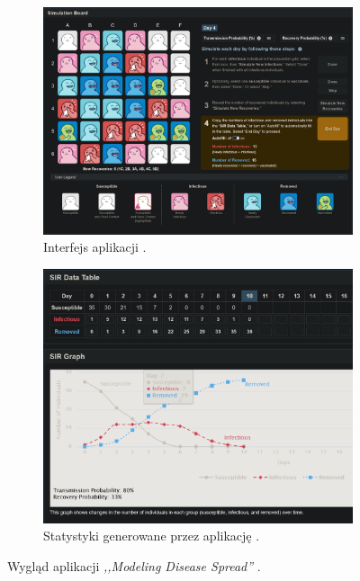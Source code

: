 \begin{figure}
	\centering
	\begin{subfigure}{0.8\textwidth}
		\includegraphics[width=\textwidth]{biointeractiveSIR.png}
		\caption{Interfejs aplikacji \cite{bib:BioInteractiveApp}.}
		\label{fig:lewy-gorny}
	\end{subfigure}
	
	\vspace{1cm} %
	
	\begin{subfigure}{0.8\textwidth}
		\includegraphics[width=\textwidth]{biointeractiveSIR1.png}
		\caption{Statystyki generowane przez aplikację \cite{bib:BioInteractiveApp}.}
		\label{fig:prawy-gorny}
	\end{subfigure}
	
	\caption{Wygląd aplikacji \textit{,,Modeling Disease Spread''} \cite{bib:BioInteractiveApp}.}
	\label{fig:BioInteractiveAppScreen}
\end{figure}




